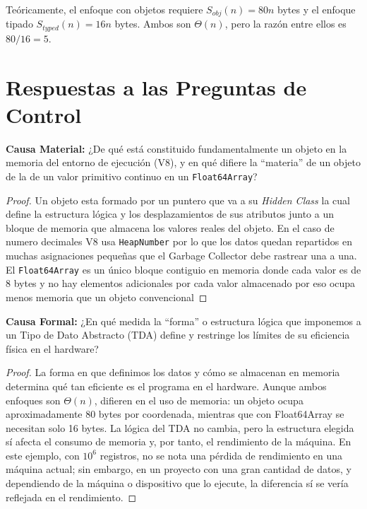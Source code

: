 \documentclass[11pt]{article}
\begin{document}
Teóricamente, el enfoque con objetos requiere $S_{obj}(n)=80n$ bytes y el enfoque tipado $S_{typed}(n)=16n$ bytes. Ambos son $\Theta(n)$, pero la razón entre ellos es $80/16=5$.


\section{Respuestas a las Preguntas de Control}

\begin{ejer}
    \textbf{Causa Material:} ¿De qué está constituido fundamentalmente un objeto en la memoria del entorno de ejecución (V8), y en qué difiere la ``materia'' de un objeto de la de un valor primitivo continuo en un \texttt{Float64Array}?
\end{ejer}

\begin{proof}\hspace{0pt}
   
    Un objeto esta formado por un puntero que va a su \emph{Hidden Class}  la cual define la estructura lógica y los desplazamientos de sus atributos junto a un bloque de memoria que almacena los valores reales del objeto. En el caso de numero decimales V8 usa  \texttt{HeapNumber} por lo que los datos quedan repartidos en muchas asignaciones pequeñas que el Garbage Collector debe rastrear una a una.
    El \texttt{Float64Array} es un único bloque contiguio en memoria donde cada valor es de 8 bytes y no hay elementos adicionales por cada valor almacenado por eso ocupa menos memoria que un objeto convencional  

\end{proof}

\begin{ejer}
    \textbf{Causa Formal:} ¿En qué medida la ``forma'' o estructura lógica que imponemos a un Tipo de Dato Abstracto (TDA) define y restringe los límites de su eficiencia física en el hardware?
\end{ejer}

\begin{proof}\hspace{0pt}
   La forma en que definimos los datos y cómo se almacenan en memoria determina qué tan eficiente es el programa en el hardware. Aunque ambos enfoques son $\Theta(n)$, difieren en el uso de memoria: un objeto ocupa aproximadamente 80 bytes por coordenada, mientras que con Float64Array se necesitan solo 16 bytes. La lógica del TDA no cambia, pero la estructura elegida sí afecta el consumo de memoria y, por tanto, el rendimiento de la máquina. En este ejemplo, con $10^6$ registros, no se nota una pérdida de rendimiento en una máquina actual; sin embargo, en un proyecto con una gran cantidad de datos, y dependiendo de la máquina o dispositivo que lo ejecute, la diferencia sí se vería reflejada en el rendimiento.
\end{proof}
\end{document}
